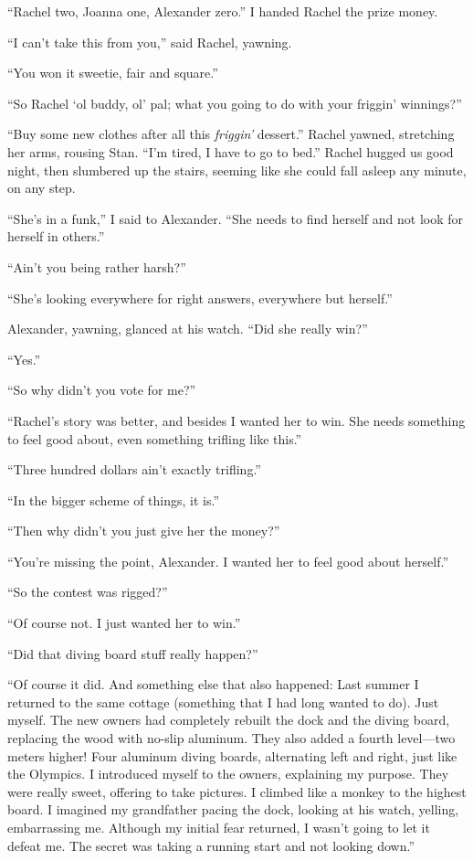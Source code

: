 ``Rachel two, Joanna one, Alexander zero.'' I handed Rachel the prize
money.

``I can't take this from you,'' said Rachel, yawning.

``You won it sweetie, fair and square.''

``So Rachel `ol buddy, ol' pal; what you going to do with your friggin'
winnings?''

``Buy some new clothes after all this \emph{friggin'} dessert.'' Rachel
yawned, stretching her arms, rousing Stan. ``I'm tired, I have to go to
bed.'' Rachel hugged us good night, then slumbered up the stairs,
seeming like she could fall asleep any minute, on any step.

``She's in a funk,'' I said to Alexander. ``She needs to find herself
and not look for herself in others.''

``Ain't you being rather harsh?''

``She's looking everywhere for right answers, everywhere but herself.''

Alexander, yawning, glanced at his watch. ``Did she really win?''

``Yes.''

``So why didn't you vote for me?''

``Rachel's story was better, and besides I wanted her to win. She needs
something to feel good about, even something trifling like this.''

``Three hundred dollars ain't exactly trifling.''

``In the bigger scheme of things, it is.''

``Then why didn't you just give her the money?''

``You're missing the point, Alexander. I wanted her to feel good about
herself.''

``So the contest was rigged?''

``Of course not. I just wanted her to win.''

``Did that diving board stuff really happen?''

``Of course it did. And something else that also happened: Last summer I
returned to the same cottage (something that I had long wanted to do).
Just myself. The new owners had completely rebuilt the dock and the
diving board, replacing the wood with no-slip aluminum. They also added
a fourth level---two meters higher! Four aluminum diving boards,
alternating left and right, just like the Olympics. I introduced myself
to the owners, explaining my purpose. They were really sweet, offering
to take pictures. I climbed like a monkey to the highest board. I
imagined my grandfather pacing the dock, looking at his watch, yelling,
embarrassing me. Although my initial fear returned, I wasn't going to
let it defeat me. The secret was taking a running start and not looking
down.''

